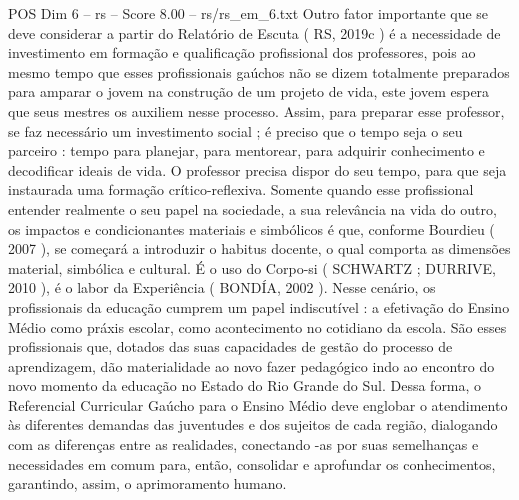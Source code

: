 \begin{textsample}{POS Dim 6 – rs – Score 8.00 – rs/rs\_em\_6.txt}
Outro fator importante que se deve considerar a partir do Relatório de Escuta ( RS, 2019c ) é a necessidade de investimento em formação e qualificação profissional dos professores, pois ao mesmo tempo que esses profissionais gaúchos não se dizem totalmente preparados para amparar o jovem na construção de um projeto de vida, este jovem espera que seus mestres os auxiliem nesse processo.
Assim, para preparar esse professor, se faz necessário um investimento social ; é preciso que o tempo seja o seu parceiro : tempo para planejar, para mentorear, para adquirir conhecimento e decodificar ideais de vida.
O professor precisa dispor do seu tempo, para que seja instaurada uma formação crítico-reflexiva.
Somente quando esse profissional entender realmente o seu papel na sociedade, a sua relevância na vida do outro, os impactos e condicionantes materiais e simbólicos é que, conforme Bourdieu ( 2007 ), se começará a introduzir o habitus docente, o qual comporta as dimensões material, simbólica e cultural.
É o uso do Corpo-si ( SCHWARTZ ; DURRIVE, 2010 ), é o labor da Experiência ( BONDÍA, 2002 ).
Nesse cenário, os profissionais da educação cumprem um papel indiscutível : a efetivação do Ensino Médio como práxis escolar, como acontecimento no cotidiano da escola.
São esses profissionais que, dotados das suas capacidades de gestão do processo de aprendizagem, dão materialidade ao novo fazer pedagógico indo ao encontro do novo momento da educação no Estado do Rio Grande do Sul.
Dessa forma, o Referencial Curricular Gaúcho para o Ensino Médio deve englobar o atendimento às diferentes demandas das juventudes e dos sujeitos de cada região, dialogando com as diferenças entre as realidades, conectando -as por suas semelhanças e necessidades em comum para, então, consolidar e aprofundar os conhecimentos, garantindo, assim, o aprimoramento humano.

\end{textsample}
